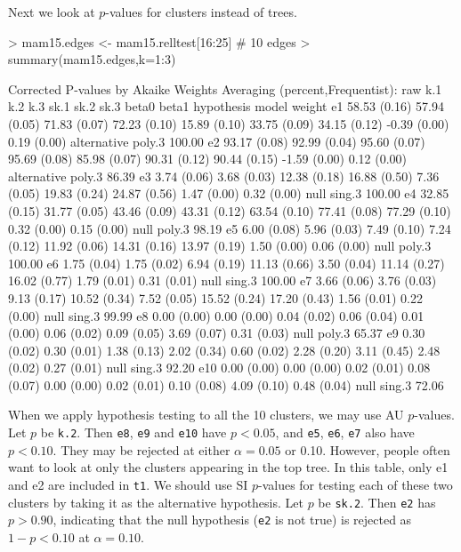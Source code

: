 \documentclass[a4paper]{amsart}
\begin{document}
Next we look at $p$-values for clusters instead of trees.
\begin{Schunk}
\begin{Sinput}
> mam15.edges <- mam15.relltest[16:25]  # 10 edges
> summary(mam15.edges,k=1:3)
\end{Sinput}
\end{Schunk}
{\tiny
\begin{Schunk}
\begin{Soutput}
Corrected P-values by Akaike Weights Averaging (percent,Frequentist):
    raw          k.1          k.2          k.3          sk.1         sk.2         sk.3         beta0        beta1       hypothesis  model  weight 
e1  58.53 (0.16) 57.94 (0.05) 71.83 (0.07) 72.23 (0.10) 15.89 (0.10) 33.75 (0.09) 34.15 (0.12) -0.39 (0.00) 0.19 (0.00) alternative poly.3 100.00 
e2  93.17 (0.08) 92.99 (0.04) 95.60 (0.07) 95.69 (0.08) 85.98 (0.07) 90.31 (0.12) 90.44 (0.15) -1.59 (0.00) 0.12 (0.00) alternative poly.3  86.39 
e3   3.74 (0.06)  3.68 (0.03) 12.38 (0.18) 16.88 (0.50)  7.36 (0.05) 19.83 (0.24) 24.87 (0.56)  1.47 (0.00) 0.32 (0.00) null        sing.3 100.00 
e4  32.85 (0.15) 31.77 (0.05) 43.46 (0.09) 43.31 (0.12) 63.54 (0.10) 77.41 (0.08) 77.29 (0.10)  0.32 (0.00) 0.15 (0.00) null        poly.3  98.19 
e5   6.00 (0.08)  5.96 (0.03)  7.49 (0.10)  7.24 (0.12) 11.92 (0.06) 14.31 (0.16) 13.97 (0.19)  1.50 (0.00) 0.06 (0.00) null        poly.3 100.00 
e6   1.75 (0.04)  1.75 (0.02)  6.94 (0.19) 11.13 (0.66)  3.50 (0.04) 11.14 (0.27) 16.02 (0.77)  1.79 (0.01) 0.31 (0.01) null        sing.3 100.00 
e7   3.66 (0.06)  3.76 (0.03)  9.13 (0.17) 10.52 (0.34)  7.52 (0.05) 15.52 (0.24) 17.20 (0.43)  1.56 (0.01) 0.22 (0.00) null        sing.3  99.99 
e8   0.00 (0.00)  0.00 (0.00)  0.04 (0.02)  0.06 (0.04)  0.01 (0.00)  0.06 (0.02)  0.09 (0.05)  3.69 (0.07) 0.31 (0.03) null        poly.3  65.37 
e9   0.30 (0.02)  0.30 (0.01)  1.38 (0.13)  2.02 (0.34)  0.60 (0.02)  2.28 (0.20)  3.11 (0.45)  2.48 (0.02) 0.27 (0.01) null        sing.3  92.20 
e10  0.00 (0.00)  0.00 (0.00)  0.02 (0.01)  0.08 (0.07)  0.00 (0.00)  0.02 (0.01)  0.10 (0.08)  4.09 (0.10) 0.48 (0.04) null        sing.3  72.06 
\end{Soutput}
\end{Schunk}
}
When we apply hypothesis testing to all the 10 clusters, we may use AU $p$-values. Let $p$ be {\tt k.2}. Then {\tt e8}, {\tt e9} and {\tt e10} have $p<0.05$, and {\tt e5}, {\tt e6}, {\tt e7} also have $p<0.10$. They may be rejected at either $\alpha=0.05$ or 0.10. However, people often want to look at only the clusters appearing in the top tree. In this table, only e1 and e2 are included in {\tt t1}. We should use SI $p$-values for testing each of these two clusters by taking it as the alternative hypothesis. Let $p$ be {\tt sk.2}. Then {\tt e2} has $p>0.90$, indicating that the null hypothesis ({\tt e2} is not true) is rejected as $1-p<0.10$ at $\alpha=0.10$.
\end{document}
